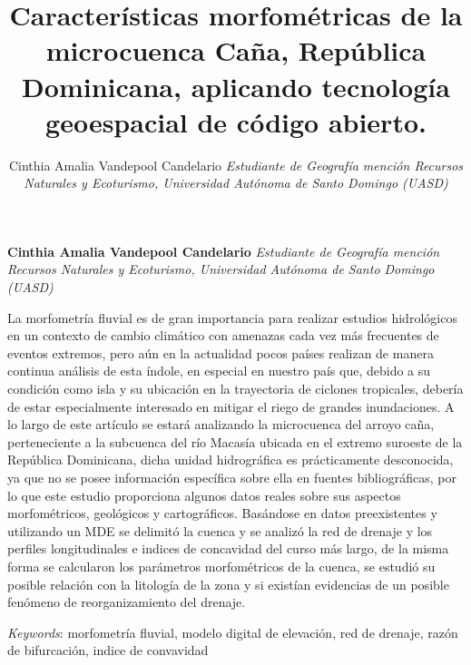 \documentclass[11pt,]{article}
\title{Características morfométricas de la microcuenca Caña, República
Dominicana, aplicando tecnología geoespacial de código abierto.  }
\author{\Large Cinthia Amalia Vandepool Candelario\vspace{0.05in} \newline\normalsize\emph{Estudiante de Geografía mención Recursos Naturales y Ecoturismo,
Universidad Autónoma de Santo Domingo (UASD)}  }
\date{}
\newcommand*{\authorfont}{\fontfamily{phv}\selectfont}
\renewenvironment{abstract}
 {{%
    \setlength{\leftmargin}{0mm}
    \setlength{\rightmargin}{\leftmargin}%
  }%
  \relax}
 {\endlist}
\begin{document}
	
%

{%
\setlength{\parindent}{0pt}
\thispagestyle{plain}
{\fontsize{18}{20}\selectfont\raggedright 
\maketitle  %

}

{
   \vskip 13.5pt\relax \normalsize\fontsize{11}{12} 
\textbf{\authorfont Cinthia Amalia Vandepool Candelario} \hskip 15pt \emph{\small Estudiante de Geografía mención Recursos Naturales y Ecoturismo,
Universidad Autónoma de Santo Domingo (UASD)}   

}

}








\begin{abstract}

    \hbox{\vrule height .2pt width 39.14pc}

    \vskip 8.5pt %

\noindent La morfometría fluvial es de gran importancia para realizar estudios
hidrológicos en un contexto de cambio climático con amenazas cada vez
más frecuentes de eventos extremos, pero aún en la actualidad pocos
países realizan de manera continua análisis de esta índole, en especial
en nuestro país que, debido a su condición como isla y su ubicación en
la trayectoria de ciclones tropicales, debería de estar especialmente
interesado en mitigar el riego de grandes inundaciones. A lo largo de
este artículo se estará analizando la microcuenca del arroyo caña,
perteneciente a la subcuenca del río Macasía ubicada en el extremo
suroeste de la República Dominicana, dicha unidad hidrográfica es
prácticamente desconocida, ya que no se posee información específica
sobre ella en fuentes bibliográficas, por lo que este estudio
proporciona algunos datos reales sobre sus aspectos morfométricos,
geológicos y cartográficos. Basándose en datos preexistentes y
utilizando un MDE se delimitó la cuenca y se analizó la red de drenaje y
los perfiles longitudinales e indices de concavidad del curso más largo,
de la misma forma se calcularon los parámetros morfométricos de la
cuenca, se estudió su posible relación con la litología de la zona y si
existían evidencias de un posible fenómeno de reorganizamiento del
drenaje.


\vskip 8.5pt \noindent \emph{Keywords}: morfometría fluvial, modelo digital de elevación, red de drenaje, razón
de bifurcación, indice de convavidad \par

    \hbox{\vrule height .2pt width 39.14pc}



\end{abstract}
\end{document}
